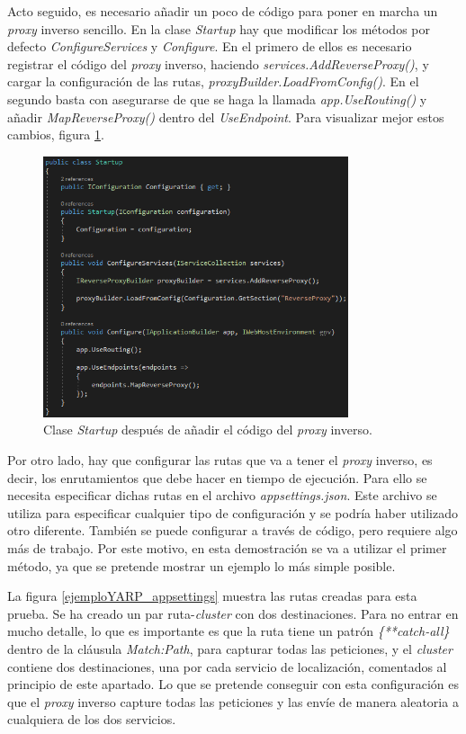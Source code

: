 \documentclass[11pt,spanish,listoffigures]{tfgetsinf}
\begin{document}
Acto seguido, es necesario añadir un poco de código para poner en marcha un \emph{proxy} inverso sencillo. En la clase \emph{Startup} hay que modificar los métodos por defecto \emph{ConfigureServices} y \emph{Configure}. En el primero de ellos es necesario registrar el código del \emph{proxy} inverso, haciendo \emph{services.AddReverseProxy()}, y cargar la configuración de las rutas, \emph{proxyBuilder.LoadFromConfig()}. En el segundo basta con asegurarse de que se haga la llamada \emph{app.UseRouting()} y añadir  \emph{MapReverseProxy()} dentro del \emph{UseEndpoint}. Para visualizar mejor estos cambios, figura \ref{ejemploYARP_startup}.

\begin{figure}[ht]
\centering
\includegraphics[width=0.8\textwidth]{imagenes/ejemploYARP/startup}
\caption{Clase \emph{Startup} después de añadir el código del \emph{proxy} inverso.}
	\label{ejemploYARP_startup}
\end{figure}

Por otro lado, hay que configurar las rutas que va a tener el \emph{proxy} inverso, es decir, los enrutamientos que debe hacer en tiempo de ejecución. Para ello se necesita especificar dichas rutas en el archivo \emph{appsettings.json}. Este archivo se utiliza para especificar cualquier tipo de configuración y se podría haber utilizado otro diferente. También se puede configurar a través de código, pero requiere algo más de trabajo. Por este motivo, en esta demostración se va a utilizar el primer método, ya que se pretende mostrar un ejemplo lo más simple posible.

La figura \ref{ejemploYARP_appsettings} muestra las rutas creadas para esta prueba. Se ha creado un par ruta-\emph{cluster} con dos destinaciones. Para no entrar en mucho detalle, lo que es importante es que la ruta tiene un patrón \emph{\{**catch-all\}} dentro de la cláusula \emph{Match:Path}, para capturar todas las peticiones, y el \emph{cluster} contiene dos destinaciones, una por cada servicio de localización, comentados al principio de este apartado. Lo que se pretende conseguir con esta configuración es que el \emph{proxy} inverso capture todas las peticiones y las envíe de manera aleatoria a cualquiera de los dos servicios.
\end{document}
